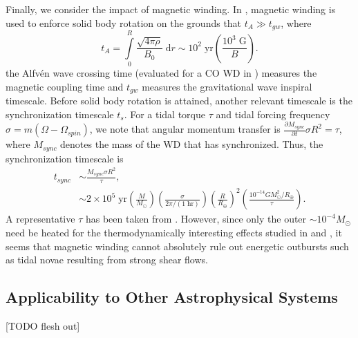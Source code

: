 \documentclass[
        fleqn,
        usenatbib,
    ]{mnras}
\newcommand*{\pd}[2]{\frac{\partial#1}{\partial#2}}
\newcommand*{\p}[1]{\left(#1\right)}
\begin{document}
Finally, we consider the impact of magnetic winding. In \citep{bukart}, magnetic
winding is used to enforce solid body rotation on the grounds that $t_A \gg
t_{gw}$, where
\begin{equation}
    t_A = \int\limits_0^R \frac{\sqrt{4\pi \rho}}{B_0}\;\mathrm{d}r
        \sim 10^2\;\mathrm{yr}\p{\frac{10^3\;\mathrm{G}}{B}}.
\end{equation}
the Alfv\'en wave crossing time (evaluated for a CO WD in \citealt{fullerIV})
measures the magnetic coupling time and $t_{gw}$ measures the gravitational wave
inspiral timescale. Before solid body rotation is attained, another relevant
timescale is the synchronization timescale $t_s$. For a tidal torque $\tau$ and
tidal forcing frequency $\sigma = m\p{\Omega - \Omega_{spin}}$, we note that
angular momentum transfer is $\pd{M_{sync}}{t} \sigma R^2 = \tau$, where
$M_{sync}$ denotes the mass of the WD that has synchronized. Thus, the
synchronization timescale is
\begin{align}
    t_{sync} &\sim \frac{M_{sync}\sigma R^2}{\tau},\nonumber\\
        &\sim 2 \times 10^5\;\mathrm{yr}
            \p{\frac{M}{M_{\odot}}}
            \p{\frac{\sigma}{2\pi / (1\;\mathrm{hr})}}
            \p{\frac{R}{R_{\oplus}}}^2
            \p{\frac{10^{-14} GM_{\odot}^2/R_{\oplus}}{\tau}}.
\end{align}
A representative $\tau$ has been taken from \citep{bukart}. However, since only
the outer $\sim 10^{-4}M_{\odot}$ need be heated for the thermodynamically
interesting effects studied in \citep{fullerIV} and \citep{tidal_novae}, it
seems that magnetic winding cannot absolutely rule out energetic outbursts such
as tidal novae resulting from strong shear flows.

\subsection{Applicability to Other Astrophysical Systems}

[TODO flesh out]
\end{document}
